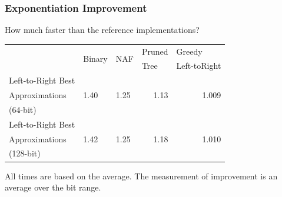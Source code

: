 \documentclass{beamer}
\newcommand{\smallfont}{\fontsize{6pt}{7.2}\selectfont}
\begin{document}
\begin{frame}
\frametitle{Exponentiation Improvement}
How much faster than the reference implementations?
\begin{table}
\centering
\begin{tabular}{ | l | l | l | l | l | }
\hline
& \multirow{2}{*}{Binary} & \multirow{2}{*}{NAF} & Pruned & Greedy \\
& & & Tree & Left-toRight \\
\hline
Left-to-Right Best & \multirow{3}{*}{1.40} & \multirow{3}{*}{1.25} & \multicolumn{1}{|r|}{\multirow{3}{*}{1.13}} & \multicolumn{1}{|r|}{\multirow{3}{*}{1.009}} \\
Approximations & & & &\\
(64-bit) & & & &\\

\hline

Left-to-Right Best & \multirow{3}{*}{1.42} & \multirow{3}{*}{1.25} & \multicolumn{1}{|r|}{\multirow{3}{*}{1.18}} & \multicolumn{1}{|r|}{\multirow{3}{*}{1.010}} \\
Approximations & & & &\\
(128-bit) & & & &\\

\hline
\end{tabular}
\end{table}

\bigskip
\smallfont
All times are based on the average.  The measurement of improvement is an average over the bit range.
\end{frame}
\end{document}
